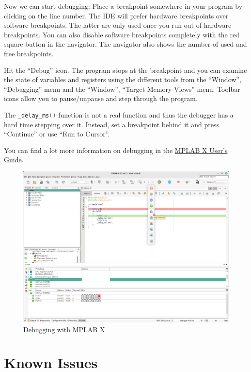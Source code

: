 \documentclass{article}
\newenvironment{note}{\begin{tcolorbox}[colback=blue!5!white,colframe=blue!75!black,title=\textbf{Note}]}{\end{tcolorbox}}
\begin{document}
Now we can start debugging: Place a breakpoint somewhere in your program by clicking on the line number. The IDE will prefer hardware breakpoints over software breakpoints. The latter are only used once you run out of hardware breakpoints. You can also disable software breakpoints completely with the red square button in the navigator. The navigator also shows the number of used and free breakpoints. 

Hit the ``Debug'' icon. The program stops at the breakpoint and you can examine the state of variables and registers using the different tools from the ``Window'', ``Debugging'' menu and the ``Window'', ``Target Memory Views'' menu. Toolbar icons allow you to pause/unpause and step through the program. 

\begin{note}
The \lstinline[language=C]{_delay_ms()} function is not a real function and thus the debugger has a hard time stepping over it. Instead, set a breakpoint behind it and press ``Continue'' or use ``Run to Cursor''. 
\end{note}

You can find a lot more information on debugging in the \href{https://ww1.microchip.com/downloads/en/DeviceDoc/50002027E.pdf}{MPLAB X User's Guide}. 

\begin{figure}[htb]
\centering
\includegraphics[width=\textwidth]{Pictures/DebugMPLABX2.png}
\caption{Debugging with MPLAB X}
\label{fig:debugMplabX2}
\end{figure}

\section{Known Issues}
\end{document}

